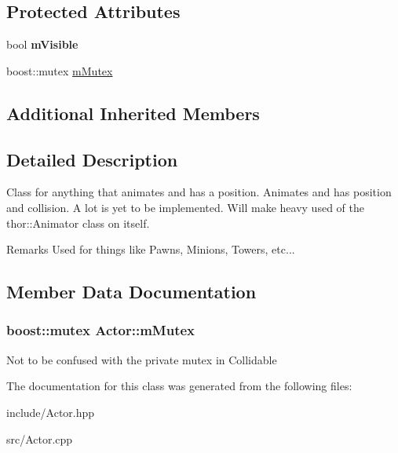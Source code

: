 \subsection*{Protected Attributes}
\begin{DoxyCompactItemize}
\item 
\hypertarget{class_actor_a189eba290bff18e57ca29a638f807ff0}{}bool {\bfseries m\+Visible}\label{class_actor_a189eba290bff18e57ca29a638f807ff0}

\item 
boost\+::mutex \hyperlink{class_actor_a3515de0782a3532d5af19daaf7d82fe3}{m\+Mutex}
\end{DoxyCompactItemize}
\subsection*{Additional Inherited Members}


\subsection{Detailed Description}
Class for anything that animates and has a position. Animates and has position and collision. A lot is yet to be implemented. Will make heavy used of the thor\+::\+Animator class on itself. 

\begin{DoxyRemark}{Remarks}
Used for things like Pawns, Minions, Towers, etc... 
\end{DoxyRemark}


\subsection{Member Data Documentation}
\hypertarget{class_actor_a3515de0782a3532d5af19daaf7d82fe3}{}
\subsubsection[{m\+Mutex}]{\setlength{\rightskip}{0pt plus 5cm}boost\+::mutex Actor\+::m\+Mutex\hspace{0.3cm}{\ttfamily [protected]}}\label{class_actor_a3515de0782a3532d5af19daaf7d82fe3}
Not to be confused with the private mutex in Collidable 

The documentation for this class was generated from the following files\+:\begin{DoxyCompactItemize}
\item 
include/Actor.\+hpp\item 
src/Actor.\+cpp\end{DoxyCompactItemize}
